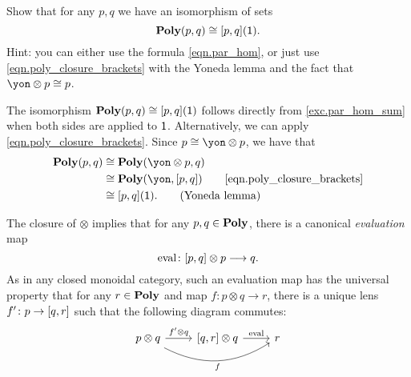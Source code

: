 \documentclass[Book-Poly]{subfiles}
\begin{document}
\begin{exercise}\label{exc.poly_plug_1}
Show that for any $p,q$ we have an isomorphism of sets
\[
\mathbf{Poly}(p,q) \cong [p,q](\textsf{1}).
\]
Hint: you can either use the formula \eqref{eqn.par_hom}, or just use 
\eqref{eqn.poly_closure_brackets} with the Yoneda lemma and the fact that $\yon\otimes p \iso p$.
\begin{solution}
The isomorphism $\mathbf{Poly}(p,q) \cong [p,q](\textsf{1})$ follows directly from \cref{exc.par_hom_sum} when both sides are applied to $\textsf{1}$.
Alternatively, we can apply \eqref{eqn.poly_closure_brackets}.
Since $p \iso \yon \otimes p$, we have that
\begin{align*}
    \poly(p, q) &\iso \poly(\yon \otimes p, q) \\
    &\iso \poly(\yon, \ihom{p,q}) \tag*{\eqref{eqn.poly_closure_brackets}} \\
    &\iso \ihom{p,q}(\1). \tag{Yoneda lemma}
\end{align*}
\end{solution}
\end{exercise}

The closure of $\otimes$ implies that for any $p,q\in\mathbf{Poly}$, there is a canonical \emph{evaluation} map
\begin{equation}\label{eqn.eval_parallel}
  \mathrm{eval}\colon [p,q]\otimes p\longrightarrow q.
\end{equation}
As in any closed monoidal category, such an evaluation map has the universal property that for any $r\in\mathbf{Poly}$ and map $f\colon p\otimes q\to r$, there is a unique lens $f'\colon p\to[q,r]$ such that the following diagram commutes:
\[
    \begin{tikzcd}
    	p\otimes q\ar[r, "f'\otimes q"]\ar[rr, bend right, "f"']&
    	{\ihom{q,r}}\otimes q\ar[r, "\fun{eval}"]&
    	r
    \end{tikzcd}
\]
\end{document}
